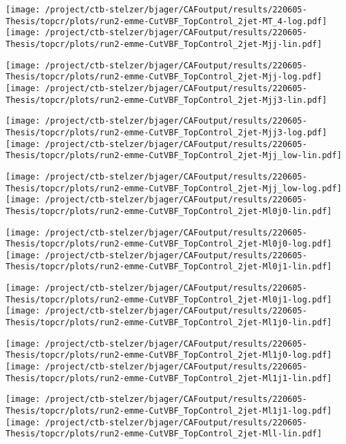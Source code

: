 \documentclass{article}
\begin{document}
\texttt{[image: /project/ctb-stelzer/bjager/CAFoutput/results/220605-Thesis/topcr/plots/run2-emme-CutVBF\_TopControl\_2jet-MT\_4-log.pdf]}\texttt{[image: /project/ctb-stelzer/bjager/CAFoutput/results/220605-Thesis/topcr/plots/run2-emme-CutVBF\_TopControl\_2jet-Mjj-lin.pdf]}

\texttt{[image: /project/ctb-stelzer/bjager/CAFoutput/results/220605-Thesis/topcr/plots/run2-emme-CutVBF\_TopControl\_2jet-Mjj-log.pdf]}\texttt{[image: /project/ctb-stelzer/bjager/CAFoutput/results/220605-Thesis/topcr/plots/run2-emme-CutVBF\_TopControl\_2jet-Mjj3-lin.pdf]}

\texttt{[image: /project/ctb-stelzer/bjager/CAFoutput/results/220605-Thesis/topcr/plots/run2-emme-CutVBF\_TopControl\_2jet-Mjj3-log.pdf]}\texttt{[image: /project/ctb-stelzer/bjager/CAFoutput/results/220605-Thesis/topcr/plots/run2-emme-CutVBF\_TopControl\_2jet-Mjj\_low-lin.pdf]}

\texttt{[image: /project/ctb-stelzer/bjager/CAFoutput/results/220605-Thesis/topcr/plots/run2-emme-CutVBF\_TopControl\_2jet-Mjj\_low-log.pdf]}\texttt{[image: /project/ctb-stelzer/bjager/CAFoutput/results/220605-Thesis/topcr/plots/run2-emme-CutVBF\_TopControl\_2jet-Ml0j0-lin.pdf]}

\texttt{[image: /project/ctb-stelzer/bjager/CAFoutput/results/220605-Thesis/topcr/plots/run2-emme-CutVBF\_TopControl\_2jet-Ml0j0-log.pdf]}\texttt{[image: /project/ctb-stelzer/bjager/CAFoutput/results/220605-Thesis/topcr/plots/run2-emme-CutVBF\_TopControl\_2jet-Ml0j1-lin.pdf]}

\texttt{[image: /project/ctb-stelzer/bjager/CAFoutput/results/220605-Thesis/topcr/plots/run2-emme-CutVBF\_TopControl\_2jet-Ml0j1-log.pdf]}\texttt{[image: /project/ctb-stelzer/bjager/CAFoutput/results/220605-Thesis/topcr/plots/run2-emme-CutVBF\_TopControl\_2jet-Ml1j0-lin.pdf]}

\texttt{[image: /project/ctb-stelzer/bjager/CAFoutput/results/220605-Thesis/topcr/plots/run2-emme-CutVBF\_TopControl\_2jet-Ml1j0-log.pdf]}\texttt{[image: /project/ctb-stelzer/bjager/CAFoutput/results/220605-Thesis/topcr/plots/run2-emme-CutVBF\_TopControl\_2jet-Ml1j1-lin.pdf]}

\texttt{[image: /project/ctb-stelzer/bjager/CAFoutput/results/220605-Thesis/topcr/plots/run2-emme-CutVBF\_TopControl\_2jet-Ml1j1-log.pdf]}\texttt{[image: /project/ctb-stelzer/bjager/CAFoutput/results/220605-Thesis/topcr/plots/run2-emme-CutVBF\_TopControl\_2jet-Mll-lin.pdf]}
\end{document}
